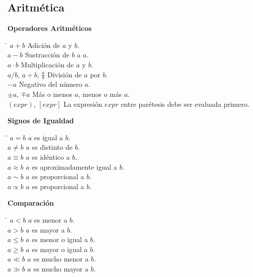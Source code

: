 \documentclass[11pt,letterpaper,twoside]{report}%
\begin{document}
\subsection{Aritmética}

{\bf Operadores Aritméticos}
\begin{tabbing}
\hspace{\hdiml} \= \hspace{\hdim} \kill
$a+b$  \> Adición de $a$ y $b$.\\[\lsk]
$a-b$  \> Sustracción de $b$ a $a$.\\[\lsk]
$a\cdot b$ \> Multiplicación de $a$ y $b$.\\[\lsk]
$a/b$, $a\div b$, $\frac{a}{b}$ \> División de $a$ por $b$.\\[\lsk]
$-a$   \> Negativo del número $a$.\\[\lsk]
$\pm a$, $\mp a$ \> Más o menos $a$, menos o más $a$.\\[\lsk]
$(expr)$, $[expr]$ \> La expresión $expr$ entre parétesis debe ser evaluada primero.\\[\lsk] 
\end{tabbing}

{\bf Signos de Igualdad}
\begin{tabbing}
\hspace{\hdiml} \= \hspace{\hdim} \kill
$a=b$  \> $a$ es igual a $b$.\\[\lsk]
$a\neq b$  \> $a$ es distinto de $b$.\\[\lsk]
$a\equiv b$ \> $a$ es idéntico a $b$.\\[\lsk]
$a\approx b$ \> $a$ es aproximadamente igual a $b$.\\[\lsk]
$a\sim b$ \> $a$ es proporcional a $b$.\\[\lsk]
$a\propto b$ \> $a$ es proporcional a $b$.\\[\lsk]
\end{tabbing}

{\bf Comparación}
\begin{tabbing}
\hspace{\hdiml} \= \hspace{\hdim} \kill
$a<b$  \> $a$ es menor a $b$.\\[\lsk]
$a>b$  \> $a$ es mayor a $b$.\\[\lsk]
$a\leq b$ \> $a$ es menor o igual a $b$.\\[\lsk]
$a\geq b$ \> $a$ es mayor o igual a $b$.\\[\lsk]
$a\ll b$ \> $a$ es mucho menor a $b$.\\[\lsk]
$a\gg b$ \> $a$ es mucho mayor a $b$.\\[\lsk]
\end{tabbing}
\end{document}
